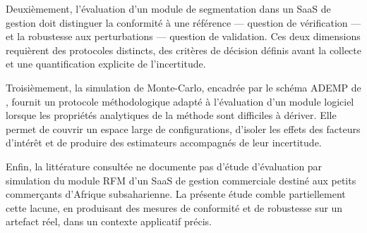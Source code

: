 Deuxièmement, l'évaluation d'un module de segmentation dans un SaaS de gestion doit
distinguer la conformité à une référence — question de vérification — et la robustesse
aux perturbations — question de validation. Ces deux dimensions requièrent des protocoles
distincts, des critères de décision définis avant la collecte et une quantification explicite
de l'incertitude.

Troisièmement, la simulation de Monte-Carlo, encadrée par le schéma ADEMP de
\citet{Morris2019}, fournit un protocole méthodologique adapté à l'évaluation d'un module
logiciel lorsque les propriétés analytiques de la méthode sont difficiles à dériver. Elle
permet de couvrir un espace large de configurations, d'isoler les effets des facteurs
d'intérêt et de produire des estimateurs accompagnés de leur incertitude.

Enfin, la littérature consultée ne documente pas d'étude d'évaluation par simulation du
module RFM d'un SaaS de gestion commerciale destiné aux petits commerçants d'Afrique
subsaharienne. La présente étude comble partiellement cette lacune, en produisant des
mesures de conformité et de robustesse sur un artefact réel, dans un contexte applicatif
précis.
